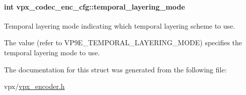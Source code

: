 \paragraph[{\texorpdfstring{temporal\+\_\+layering\+\_\+mode}{temporal_layering_mode}}]{\setlength{\rightskip}{0pt plus 5cm}int vpx\+\_\+codec\+\_\+enc\+\_\+cfg\+::temporal\+\_\+layering\+\_\+mode}\hypertarget{structvpx__codec__enc__cfg_a07c78dd29423d5ab475b9d77a0107d16}{}\label{structvpx__codec__enc__cfg_a07c78dd29423d5ab475b9d77a0107d16}


Temporal layering mode indicating which temporal layering scheme to use. 

The value (refer to V\+P9\+E\+\_\+\+T\+E\+M\+P\+O\+R\+A\+L\+\_\+\+L\+A\+Y\+E\+R\+I\+N\+G\+\_\+\+M\+O\+DE) specifies the temporal layering mode to use. 

The documentation for this struct was generated from the following file\+:\begin{DoxyCompactItemize}
\item 
vpx/\hyperlink{vpx__encoder_8h}{vpx\+\_\+encoder.\+h}\end{DoxyCompactItemize}
